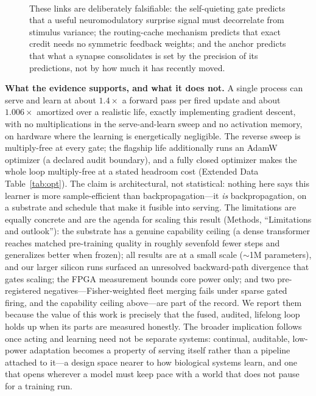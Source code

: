 \documentclass[sn-nature]{sn-jnl}   %
\newcommand{\heading}[1]{\vspace{4pt}\noindent\textbf{#1}\hspace{0.6em}}
\begin{document}
\begin{figure}[t]
{\begin{minipage}{0.94\columnwidth}
\begin{tabular}{@{}p{0.30\linewidth}p{0.63\linewidth}@{}}
\bottomrule
\end{tabular}
\vspace{2pt}\\
\footnotesize These links are deliberately falsifiable: the self-quieting gate
predicts that a useful neuromodulatory surprise signal must decorrelate from
stimulus variance; the routing-cache mechanism predicts that exact credit needs no
symmetric feedback weights\cite{lillicrap2016random,payeur2021burst,
bellec2020solution}; and the anchor predicts that what a synapse consolidates is
set by the precision of its predictions, not by how much it has recently moved.
\end{minipage}}
\label{box:neuro}
\end{figure}

\heading{What the evidence supports, and what it does not.}
A single process can serve and learn at about $1.4\times$ a forward pass per
fired update and about $1.006\times$ amortized over a realistic life, exactly
implementing gradient descent, with no multiplications in the serve-and-learn
sweep and no activation memory, on hardware where the learning is energetically
negligible. The reverse sweep is multiply-free at every gate; the flagship life
additionally runs an AdamW optimizer (a declared audit boundary), and a fully
closed optimizer makes the whole loop multiply-free at a stated headroom cost
(Extended Data Table~\ref{tab:opt}). The claim is architectural, not statistical: nothing here says this
learner is more sample-efficient than backpropagation---it \emph{is}
backpropagation, on a substrate and schedule that make it fusible into serving.
The limitations are equally concrete and are the agenda for scaling this result
(Methods, ``Limitations and outlook''): the substrate has a genuine capability
ceiling (a dense transformer reaches matched pre-training quality in roughly
sevenfold fewer steps and generalizes better when frozen); all results are at a
small scale ($\sim$1M parameters), and our larger silicon runs surfaced an
unresolved backward-path divergence that gates scaling; the FPGA measurement
bounds core power only; and two pre-registered negatives---Fisher-weighted fleet
merging fails under sparse gated firing, and the capability ceiling above---are
part of the record. We report them because the value of this work is precisely
that the fused, audited, lifelong loop holds up when its parts are measured
honestly. The broader implication follows once acting and learning need not be
separate systems: continual, auditable, low-power adaptation becomes a property
of serving itself rather than a pipeline attached to it---a design space nearer
to how biological systems learn, and one that opens wherever a model must keep
pace with a world that does not pause for a training run.
\end{document}

